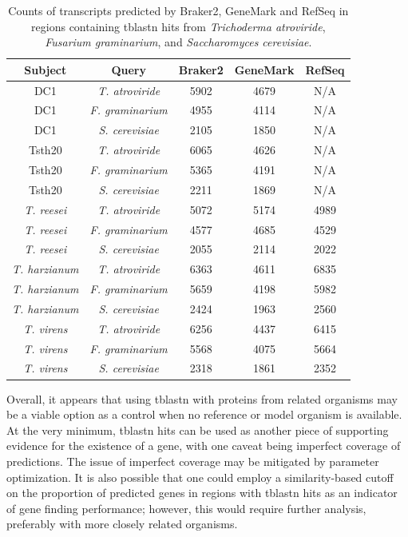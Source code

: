 \begin{table}
  \centering
  \begin{tabular}{|c|c|c|c|c|}
    \hline
    Subject & Query & Braker2 & GeneMark & RefSeq \\ \hline
    DC1 & \textit{T. atroviride} & 5902 & 4679 & N/A \\ \hline
    DC1 & \textit{F. graminarium} & 4955 & 4114 & N/A \\ \hline
    DC1 & \textit{S. cerevisiae} & 2105 & 1850 & N/A \\ \hline
    Tsth20 & \textit{T. atroviride} & 6065 & 4626 & N/A \\ \hline
    Tsth20 & \textit{F. graminarium} & 5365 & 4191 & N/A \\ \hline
    Tsth20 & \textit{S. cerevisiae} & 2211 & 1869 & N/A \\ \hline
    \textit{T. reesei} & \textit{T. atroviride} & 5072 & 5174 & 4989 \\ \hline
    \textit{T. reesei} & \textit{F. graminarium} & 4577 & 4685 & 4529 \\ \hline
    \textit{T. reesei} & \textit{S. cerevisiae} & 2055 & 2114 & 2022 \\ \hline
    \textit{T. harzianum} & \textit{T. atroviride} & 6363 & 4611 & 6835 \\ \hline
    \textit{T. harzianum} & \textit{F. graminarium} & 5659 & 4198 & 5982 \\ \hline
    \textit{T. harzianum} & \textit{S. cerevisiae} & 2424 & 1963 & 2560 \\ \hline
    \textit{T. virens} & \textit{T. atroviride} & 6256 & 4437 & 6415 \\ \hline
    \textit{T. virens} & \textit{F. graminarium} & 5568 & 4075 & 5664 \\ \hline
    \textit{T. virens} & \textit{S. cerevisiae} & 2318 & 1861 & 2352 \\ \hline
  \end{tabular}
  \caption[Counts of transcripts in regions with tblastn hits]{Counts of transcripts predicted by Braker2, GeneMark and
    RefSeq in regions containing tblastn hits from
    \textit{Trichoderma atroviride}, \textit{Fusarium graminarium},
    and \textit{Saccharomyces cerevisiae}.}\label{table:tblastn-genes}
\end{table}

Overall, it appears that using tblastn with proteins from related
organisms may be a viable option as a control when no reference or
model organism is available. At the very minimum, tblastn hits can be
used as another piece of supporting evidence for the existence of a
gene, with one caveat being imperfect coverage of predictions. The
issue of imperfect coverage may be mitigated by parameter
optimization. It is also possible that one could employ a
similarity-based cutoff on the proportion of predicted genes in
regions with tblastn hits as an indicator of gene finding performance;
however, this would require further analysis, preferably with more
closely related organisms.
